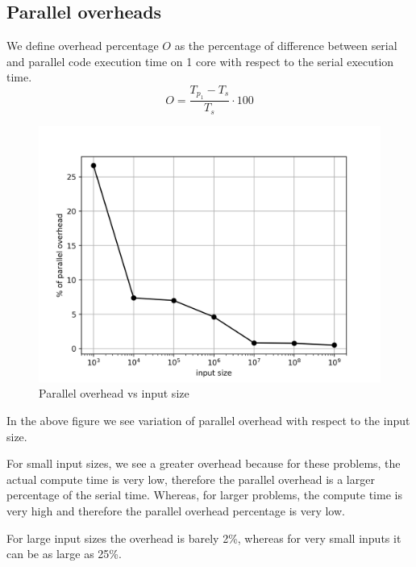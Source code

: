 \documentclass[12,a4paper]{article}
\begin{document}
{    \subsection{Parallel overheads}
    We define overhead percentage $O$ as the percentage of difference between serial and parallel code execution time on 1 core with respect to the serial execution time.
    \begin{equation}
        O = \frac{T_{p_1} - T_s}{T_s} \cdot 100
    \end{equation}
    \begin{figure}[H]
        \centering
        \includegraphics[width=\textwidth]{pioverhead.png}
        \caption{Parallel overhead vs input size}
        \label{fig:q1p8}
    \end{figure}
    In the above figure we see variation of parallel overhead with respect to the input size.
    
    For small input sizes, we see a greater overhead because for these problems, the actual compute time is very low, therefore the parallel overhead is a larger percentage of the serial time. Whereas, for larger problems, the compute time is very high and therefore the parallel overhead percentage is very low.
    
    For large input sizes the overhead is barely 2\%, whereas for very small inputs it can be as large as 25\%.
    \newpage
}
\end{document}

